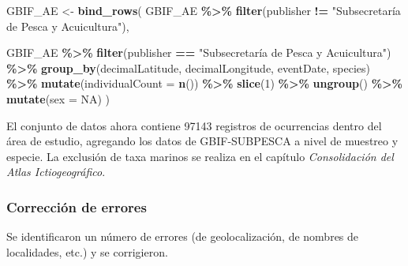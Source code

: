 \documentclass[sn-apa,pdflatex]{sn-jnl}
\newenvironment{Shaded}{\begin{snugshade}}{\end{snugshade}}
\newcommand{\AttributeTok}[1]{\textcolor[rgb]{0.13,0.29,0.53}{#1}}
\newcommand{\ConstantTok}[1]{\textcolor[rgb]{0.56,0.35,0.01}{#1}}
\newcommand{\DecValTok}[1]{\textcolor[rgb]{0.00,0.00,0.81}{#1}}
\newcommand{\FunctionTok}[1]{\textcolor[rgb]{0.13,0.29,0.53}{\textbf{#1}}}
\newcommand{\NormalTok}[1]{#1}
\newcommand{\OtherTok}[1]{\textcolor[rgb]{0.56,0.35,0.01}{#1}}
\newcommand{\SpecialCharTok}[1]{\textcolor[rgb]{0.81,0.36,0.00}{\textbf{#1}}}
\newcommand{\StringTok}[1]{\textcolor[rgb]{0.31,0.60,0.02}{#1}}
\begin{document}
\begin{Shaded}
\begin{Highlighting}[]
\NormalTok{GBIF\_AE }\OtherTok{\textless{}{-}} \FunctionTok{bind\_rows}\NormalTok{(}
\NormalTok{  GBIF\_AE }\SpecialCharTok{\%\textgreater{}\%}
    \FunctionTok{filter}\NormalTok{(publisher }\SpecialCharTok{!=} \StringTok{"Subsecretaría de Pesca y Acuicultura"}\NormalTok{),}
  
\NormalTok{  GBIF\_AE }\SpecialCharTok{\%\textgreater{}\%}
    \FunctionTok{filter}\NormalTok{(publisher }\SpecialCharTok{==} \StringTok{"Subsecretaría de Pesca y Acuicultura"}\NormalTok{) }\SpecialCharTok{\%\textgreater{}\%}
    \FunctionTok{group\_by}\NormalTok{(decimalLatitude, decimalLongitude, eventDate, species) }\SpecialCharTok{\%\textgreater{}\%}
    \FunctionTok{mutate}\NormalTok{(}\AttributeTok{individualCount =} \FunctionTok{n}\NormalTok{()) }\SpecialCharTok{\%\textgreater{}\%}
    \FunctionTok{slice}\NormalTok{(}\DecValTok{1}\NormalTok{) }\SpecialCharTok{\%\textgreater{}\%}
    \FunctionTok{ungroup}\NormalTok{() }\SpecialCharTok{\%\textgreater{}\%}
    \FunctionTok{mutate}\NormalTok{(}\AttributeTok{sex =} \ConstantTok{NA}\NormalTok{)}
\NormalTok{)}
\end{Highlighting}
\end{Shaded}

El conjunto de datos ahora contiene 97143 registros de ocurrencias
dentro del área de estudio, agregando los datos de GBIF-SUBPESCA a nivel
de muestreo y especie. La exclusión de taxa marinos se realiza en el
capítulo \emph{Consolidación del Atlas Ictiogeográfico}.

\subsubsection{Corrección de errores}\label{correcciuxf3n-de-errores-3}

Se identificaron un número de errores (de geolocalización, de nombres de
localidades, etc.) y se corrigieron.
\end{document}

